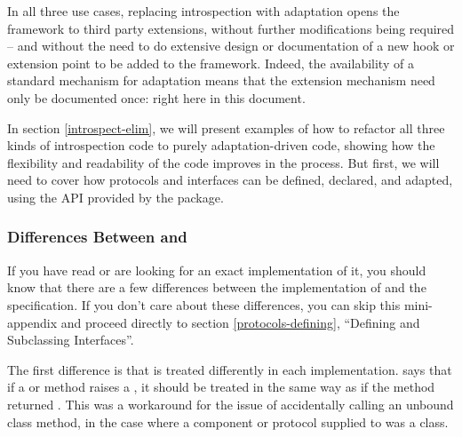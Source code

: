 In all three use cases, replacing introspection with adaptation opens the
framework to third party extensions, without further modifications being
required -- and without the need to do extensive design or documentation
of a new hook or extension point to be added to the framework.  Indeed,
the availability of a standard mechanism for adaptation means that the
extension mechanism need only be documented once: right here in this
document.


In section \ref{introspect-elim}, we will present examples of how to
refactor all three kinds of introspection code to purely adaptation-driven
code, showing how the flexibility and readability of the code improves in the
process.  But first, we will need to cover how protocols and interfaces can
be defined, declared, and adapted, using the API provided by the
 package.



































\subsubsection{Differences Between  and }

If you have read  or are looking for an exact implementation of it,
you should know that there are a few differences between the 
implementation of  and the  specification.  If you
don't care about these differences, you can skip this mini-appendix and
proceed directly to section \ref{protocols-defining}, ``Defining and Subclassing
Interfaces''.

The first difference is that  is treated differently in
each implementation.   says that if a  or
 method raises a , it should be
treated in the same way as if the method returned .  This was
a workaround for the issue of accidentally calling an unbound class
method, in the case where a component or protocol supplied to
 was a class.

